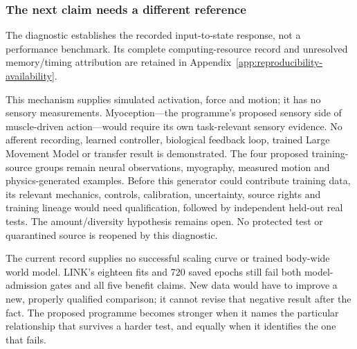 \subsubsection{The next claim needs a different reference}

The diagnostic establishes the recorded input-to-state response, not a performance benchmark. Its complete computing-resource record and unresolved memory/timing attribution are retained in Appendix~\ref{app:reproducibility-availability}.

This mechanism supplies simulated activation, force and motion; it has no sensory measurements. Myoception---the programme's proposed sensory side of muscle-driven action---would require its own task-relevant sensory evidence. No afferent recording, learned controller, biological feedback loop, trained Large Movement Model or transfer result is demonstrated. The four proposed training-source groups remain neural observations, myography, measured motion and physics-generated examples. Before this generator could contribute training data, its relevant mechanics, controls, calibration, uncertainty, source rights and training lineage would need qualification, followed by independent held-out real tests. The amount/diversity hypothesis remains open. No protected test or quarantined source is reopened by this diagnostic.

The current record supplies no successful scaling curve or trained body-wide world model. LINK's eighteen fits and 720 saved epochs still fail both model-admission gates and all five benefit claims. New data would have to improve a new, properly qualified comparison; it cannot revise that negative result after the fact. The proposed programme becomes stronger when it names the particular relationship that survives a harder test, and equally when it identifies the one that fails.
